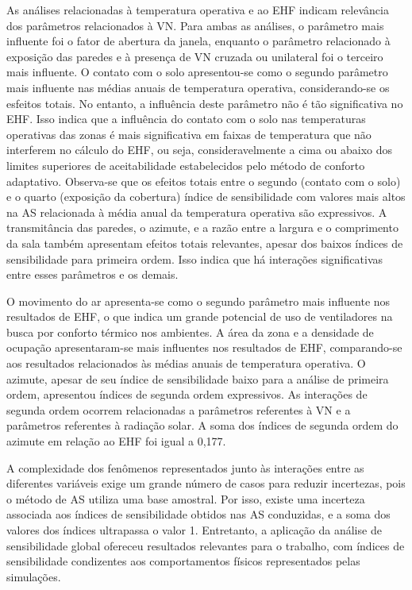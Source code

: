 \documentclass[brazil,hardcopy,openany,a4paper]{ufscthesis}
\begin{document}
	As análises relacionadas à temperatura operativa e ao EHF indicam relevância dos parâmetros relacionados à VN. Para ambas as análises, o parâmetro mais influente foi o fator de abertura da janela, enquanto o parâmetro relacionado à exposição das paredes e à presença de VN cruzada ou unilateral foi o terceiro mais influente. 
	O contato com o solo apresentou-se como o segundo parâmetro mais influente nas médias anuais de temperatura operativa, considerando-se os esfeitos totais. No entanto, a influência deste parâmetro não é tão significativa no EHF. Isso indica que a influência do contato com o solo nas temperaturas operativas das zonas é mais significativa em faixas de temperatura que não interferem no cálculo do EHF, ou seja, consideravelmente a cima ou abaixo dos limites superiores de aceitabilidade estabelecidos pelo método de conforto adaptativo.
	Observa-se que os efeitos totais entre o segundo (contato com o solo) e o quarto (exposição da cobertura) índice de sensibilidade com valores mais altos na AS relacionada à média anual da temperatura operativa são expressivos.
	A transmitância das paredes, o azimute, e a razão entre a largura e o comprimento da sala também apresentam efeitos totais relevantes, apesar dos baixos índices de sensibilidade para primeira ordem. Isso indica que há interações significativas entre esses parâmetros e os demais.
		
	O movimento do ar apresenta-se como o segundo parâmetro mais influente nos resultados de EHF, o que indica um grande potencial de uso de ventiladores na busca por conforto térmico nos ambientes. 
	A área da zona e a densidade de ocupação apresentaram-se mais influentes nos resultados de EHF, comparando-se aos resultados relacionados às médias anuais de temperatura operativa.
	O azimute, apesar de seu índice de sensibilidade baixo para a análise de primeira ordem, apresentou índices de segunda ordem expressivos. As interações de segunda ordem ocorrem relacionadas a parâmetros referentes à VN e a parâmetros referentes à radiação solar. A soma dos índices de segunda ordem do azimute em relação ao EHF foi igual a 0,177.  %
	
	A complexidade dos fenômenos representados junto às interações entre as diferentes variáveis exige um grande número de casos para reduzir incertezas, pois o método de AS utiliza uma base amostral. Por isso, existe uma incerteza associada aos índices de sensibilidade obtidos nas AS conduzidas, e a soma dos valores dos índices ultrapassa o valor 1. Entretanto, a aplicação da análise de sensibilidade global ofereceu resultados relevantes para o trabalho, com índices de sensibilidade condizentes aos comportamentos físicos representados pelas simulações. 
	
\end{document}
